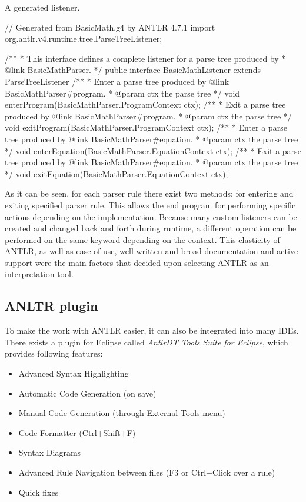 \begin{program} [hbt!]
    \caption{A generated listener. }
    \label{list:listener}
    \begin{JavaCode}
// Generated from BasicMath.g4 by ANTLR 4.7.1
import org.antlr.v4.runtime.tree.ParseTreeListener;

/**
 * This interface defines a complete listener for a parse tree produced by
 * {@link BasicMathParser}.
 */
public interface BasicMathListener extends ParseTreeListener {
	/**
	 * Enter a parse tree produced by {@link BasicMathParser#program}.
	 * @param ctx the parse tree
	 */
	void enterProgram(BasicMathParser.ProgramContext ctx);
	/**
	 * Exit a parse tree produced by {@link BasicMathParser#program}.
	 * @param ctx the parse tree
	 */
	void exitProgram(BasicMathParser.ProgramContext ctx);
	/**
	 * Enter a parse tree produced by {@link BasicMathParser#equation}.
	 * @param ctx the parse tree
	 */
	void enterEquation(BasicMathParser.EquationContext ctx);
	/**
	 * Exit a parse tree produced by {@link BasicMathParser#equation}.
	 * @param ctx the parse tree
	 */
	void exitEquation(BasicMathParser.EquationContext ctx);
}    \end{JavaCode}
\end{program}

As it can be seen, for each parser rule there exist two methods: for entering and exiting specified parser rule. This allows the end program for performing specific actions depending on the implementation. Because many custom listeners can be created and changed back and forth during runtime, a different operation can be performed on the same keyword depending on the context. This elasticity of ANTLR, as well as ease of use, well written and broad documentation and active support were the main factors that decided upon selecting ANTLR as an interpretation tool. 

\subsection{ANLTR plugin}

To make the work with ANTLR easier, it can also be integrated into many IDEs. There exists a plugin for Eclipse called \textit{AntlrDT Tools Suite for Eclipse}, which provides following features:

\begin{itemize}
   \item Advanced Syntax Highlighting
   \item Automatic Code Generation (on save)
   \item Manual Code Generation (through External Tools menu)
   \item Code Formatter (Ctrl+Shift+F)
   \item Syntax Diagrams
   \item Advanced Rule Navigation between files (F3 or Ctrl+Click over a rule)
   \item Quick fixes
\end{itemize}

